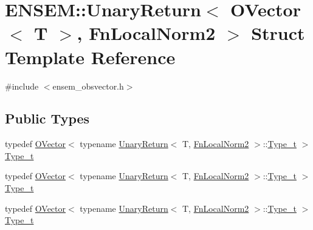 \hypertarget{structENSEM_1_1UnaryReturn_3_01OVector_3_01T_01_4_00_01FnLocalNorm2_01_4}{}\section{E\+N\+S\+EM\+:\+:Unary\+Return$<$ O\+Vector$<$ T $>$, Fn\+Local\+Norm2 $>$ Struct Template Reference}
\label{structENSEM_1_1UnaryReturn_3_01OVector_3_01T_01_4_00_01FnLocalNorm2_01_4}


{\ttfamily \#include $<$ensem\+\_\+obsvector.\+h$>$}

\subsection*{Public Types}
\begin{DoxyCompactItemize}
\item 
typedef \mbox{\hyperlink{classENSEM_1_1OVector}{O\+Vector}}$<$ typename \mbox{\hyperlink{structENSEM_1_1UnaryReturn}{Unary\+Return}}$<$ T, \mbox{\hyperlink{structENSEM_1_1FnLocalNorm2}{Fn\+Local\+Norm2}} $>$\+::\mbox{\hyperlink{structENSEM_1_1UnaryReturn_3_01OVector_3_01T_01_4_00_01FnLocalNorm2_01_4_ae6ea88d668b9a06249f8681572c8a7d4}{Type\+\_\+t}} $>$ \mbox{\hyperlink{structENSEM_1_1UnaryReturn_3_01OVector_3_01T_01_4_00_01FnLocalNorm2_01_4_ae6ea88d668b9a06249f8681572c8a7d4}{Type\+\_\+t}}
\item 
typedef \mbox{\hyperlink{classENSEM_1_1OVector}{O\+Vector}}$<$ typename \mbox{\hyperlink{structENSEM_1_1UnaryReturn}{Unary\+Return}}$<$ T, \mbox{\hyperlink{structENSEM_1_1FnLocalNorm2}{Fn\+Local\+Norm2}} $>$\+::\mbox{\hyperlink{structENSEM_1_1UnaryReturn_3_01OVector_3_01T_01_4_00_01FnLocalNorm2_01_4_ae6ea88d668b9a06249f8681572c8a7d4}{Type\+\_\+t}} $>$ \mbox{\hyperlink{structENSEM_1_1UnaryReturn_3_01OVector_3_01T_01_4_00_01FnLocalNorm2_01_4_ae6ea88d668b9a06249f8681572c8a7d4}{Type\+\_\+t}}
\item 
typedef \mbox{\hyperlink{classENSEM_1_1OVector}{O\+Vector}}$<$ typename \mbox{\hyperlink{structENSEM_1_1UnaryReturn}{Unary\+Return}}$<$ T, \mbox{\hyperlink{structENSEM_1_1FnLocalNorm2}{Fn\+Local\+Norm2}} $>$\+::\mbox{\hyperlink{structENSEM_1_1UnaryReturn_3_01OVector_3_01T_01_4_00_01FnLocalNorm2_01_4_ae6ea88d668b9a06249f8681572c8a7d4}{Type\+\_\+t}} $>$ \mbox{\hyperlink{structENSEM_1_1UnaryReturn_3_01OVector_3_01T_01_4_00_01FnLocalNorm2_01_4_ae6ea88d668b9a06249f8681572c8a7d4}{Type\+\_\+t}}
\end{DoxyCompactItemize}


